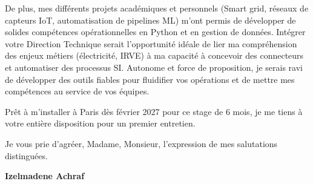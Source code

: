 \documentclass[10pt,a4paper]{../../altacv}
\begin{document}
\vspace{0.4cm}

De plus, mes différents projets académiques et personnels (Smart grid, réseaux de capteurs IoT, automatisation de pipelines ML) m'ont permis de développer de solides compétences opérationnelles en Python et en gestion de données. Intégrer votre Direction Technique serait l'opportunité idéale de lier ma compréhension des enjeux métiers (électricité, IRVE) à ma capacité à concevoir des connecteurs et automatiser des processus SI. Autonome et force de proposition, je serais ravi de développer des outils fiables pour fluidifier vos opérations et de mettre mes compétences au service de vos équipes. 

\vspace{0.4cm}

Prêt à m'installer à Paris dès février 2027 pour ce stage de 6 mois, je me tiens à votre entière disposition pour un premier entretien. 

\vspace{0.5cm}

Je vous prie d'agréer, Madame, Monsieur, l'expression de mes salutations distinguées.

\vfill

\begin{flushright}
  \Large\color{emphasis}\textbf{Izelmadene Achraf}
\end{flushright}
\end{document}
